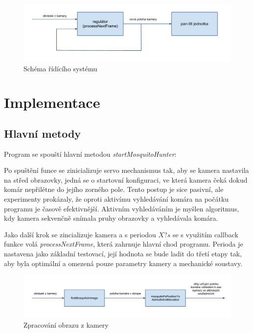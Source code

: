 \documentclass[a4paper,10pt]{article}
\begin{document}
\begin{figure}[!h]
    \centering
     \includegraphics[width=1\columnwidth]{pics/schema_ridiciho_systemu}
     \caption{Schéma řídícího systému\label{fig:rid_system}}
\end{figure}


\section{Implementace}

\subsection{Hlavní metody}

Program se spouští hlavní metodou \textit{startMosquitoHunter}:

Po spuštění funce se zinicializuje servo mechanismus tak, aby se kamera nastavila na střed obrazovky, jedná se o startovní konfiguraci, ve která kamera čeká dokud komár nepřilétne do jejího zorného pole. Tento postup je sice pasivní, ale experimenty prokázaly, že oproti aktivímu vyhledávání komára na počátku programu je časově efektivnější. Aktivním vyhledáváním je myšlen algoritmus, kdy kamera sekvenčně snímala pruhy obrazovky a vyhledávala komára.

Jako další krok se zincializuje kamera a s periodou $X? s$ se s využitím callback funkce volá \textit{processNextFrame}, která zahrnuje hlavní chod programu. Perioda je nastavena jako základní testovací, její hodnota se bude ladit do třetí etapy tak, aby byla optimální a omezená pouze parametry kamery a mechanické soustavy. 

\begin{figure}[!h]
    \centering
     \includegraphics[width=1\columnwidth]{pics/zpracovani_obrazu_z_kamery}
     \caption{Zpracování obrazu z kamery\label{fig:rid_system}}
\end{figure}
\end{document}
